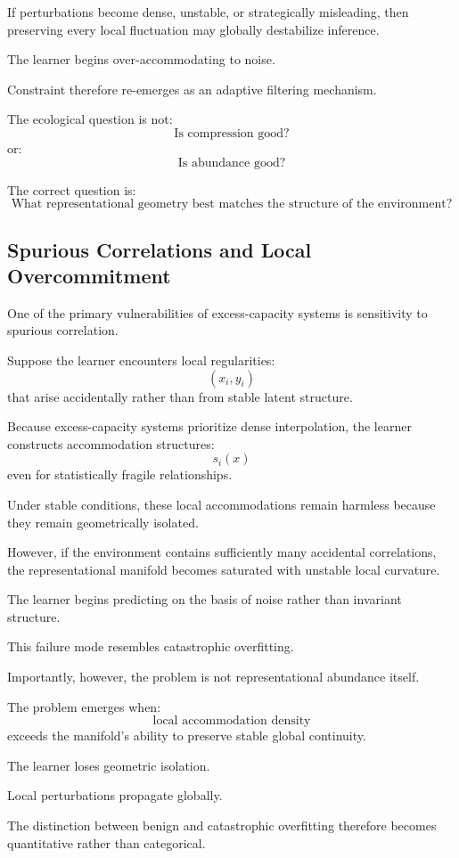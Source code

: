 \documentclass[12pt,a4paper]{article}
\begin{document}
If perturbations become dense, unstable, or strategically misleading, then preserving every local fluctuation may globally destabilize inference.

The learner begins over-accommodating to noise.

Constraint therefore re-emerges as an adaptive filtering mechanism.

The ecological question is not:
\[
\text{Is compression good?}
\]
or:
\[
\text{Is abundance good?}
\]

The correct question is:
\[
\text{What representational geometry best matches the structure of the environment?}
\]

\subsection{Spurious Correlations and Local Overcommitment}

One of the primary vulnerabilities of excess-capacity systems is sensitivity to spurious correlation.

Suppose the learner encounters local regularities:
\[
(x_i,y_i)
\]
that arise accidentally rather than from stable latent structure.

Because excess-capacity systems prioritize dense interpolation, the learner constructs accommodation structures:
\[
s_i(x)
\]
even for statistically fragile relationships.

Under stable conditions, these local accommodations remain harmless because they remain geometrically isolated.

However, if the environment contains sufficiently many accidental correlations, the representational manifold becomes saturated with unstable local curvature.

The learner begins predicting on the basis of noise rather than invariant structure.

This failure mode resembles catastrophic overfitting.

Importantly, however, the problem is not representational abundance itself.

The problem emerges when:
\[
\text{local accommodation density}
\]
exceeds the manifold's ability to preserve stable global continuity.

The learner loses geometric isolation.

Local perturbations propagate globally.

The distinction between benign and catastrophic overfitting therefore becomes quantitative rather than categorical.
\end{document}
